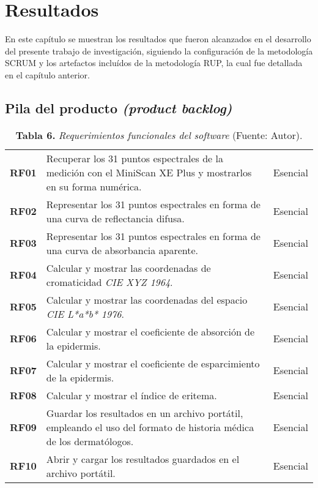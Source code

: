 \chapter{Resultados}

En este cap\'{i}tulo se muestran los resultados que fueron alcanzados en el desarrollo del presente trabajo de investigaci\'{o}n, siguiendo la configuraci\'{o}n de la metodolog\'{i}a SCRUM y los artefactos inclu\'{i}dos de la metodolog\'{i}a RUP, la cual fue detallada en el cap\'{i}tulo anterior.

\section{Pila del producto \textit{(product backlog)}}

	\FloatBarrier
	\begin{table}[htb]
		\small
		\caption{\textbf{Tabla 6.} \textit{Requerimientos funcionales del software} (Fuente: Autor).}
		\centering
		\setlength{\extrarowheight}{\altocelda}
		\begin{tabulary}{\anchotabla}{|c|J|c|}
			\hline
			 &  & \\ \hline
			\textbf{RF01} & Recuperar los 31 puntos espectrales de la medici\'{o}n con el MiniScan XE Plus y mostrarlos en su forma num\'{e}rica. & Esencial\\ \hline

			\textbf{RF02} & Representar los 31 puntos espectrales en forma de una curva de reflectancia difusa. & Esencial\\ \hline
			\textbf{RF03} & Representar los 31 puntos espectrales en forma de una curva de absorbancia aparente. & Esencial\\ \hline
			\textbf{RF04} & Calcular y mostrar las coordenadas de cromaticidad \textit{CIE XYZ 1964}. & Esencial\\ \hline
			\textbf{RF05} & Calcular y mostrar las coordenadas del espacio \textit{CIE L*a*b* 1976}. & Esencial\\ \hline
			\textbf{RF06} & Calcular y mostrar el coeficiente de absorci\'{o}n de la epidermis. & Esencial\\ \hline
			\textbf{RF07} & Calcular y mostrar el coeficiente de esparcimiento de la epidermis. & Esencial\\ \hline
			\textbf{RF08} & Calcular y mostrar el \'{i}ndice de eritema. & Esencial\\ \hline
			\textbf{RF09} & Guardar los resultados en un archivo port\'{a}til, empleando el uso del formato de historia m\'{e}dica de los dermat\'{o}logos. & Esencial\\ \hline
			\textbf{RF10} & Abrir y cargar los resultados guardados en el archivo port\'{a}til. & Esencial\\ \hline
		\end{tabulary}
	\end{table}
\FloatBarrier

